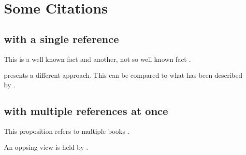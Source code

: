 \documentclass[oneside,12pt,a4paper]{scrreprt}
\begin{document}
\chapter{Some Citations}

\section{with a single reference}

This is a well known fact \parencite[p.\,5]{basseler2002} and another, not so well known fact \parencite[see][p.\,7]{samuelson1998}.

\Textcite{schumann1999} presents a different approach. This can be compared to what has been described by \textcite[pp.\,26]{felderer2003}.


\section{with multiple references at once}

This proposition refers to multiple books \parencite{blanchard2004,siebert2003}.

An oppsing view is held by \textcite{trossmann1991,mankiw2003}.


\printbibliography
\end{document}
